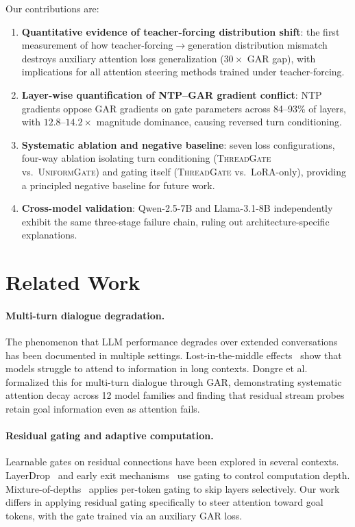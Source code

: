 \documentclass[11pt,a4paper]{article}
\newcommand{\gar}{\textsc{GAR}}
\newcommand{\tg}{\textsc{ThreadGate}}
\newcommand{\ug}{\textsc{UniformGate}}
\begin{document}
Our contributions are:
\begin{enumerate}
    \item \textbf{Quantitative evidence of teacher-forcing distribution shift}: the first measurement of how teacher-forcing$\to$generation distribution mismatch destroys auxiliary attention loss generalization ($30\times$ \gar{} gap), with implications for all attention steering methods trained under teacher-forcing.
    \item \textbf{Layer-wise quantification of NTP--\gar{} gradient conflict}: NTP gradients oppose \gar{} gradients on gate parameters across 84--93\% of layers, with $12.8$--$14.2\times$ magnitude dominance, causing reversed turn conditioning.
    \item \textbf{Systematic ablation and negative baseline}: seven loss configurations, four-way ablation isolating turn conditioning (\tg{} vs.\ \ug{}) and gating itself (\tg{} vs.\ LoRA-only), providing a principled negative baseline for future work.
    \item \textbf{Cross-model validation}: Qwen-2.5-7B and Llama-3.1-8B independently exhibit the same three-stage failure chain, ruling out architecture-specific explanations.
\end{enumerate}

\section{Related Work}
\label{sec:related}

\paragraph{Multi-turn dialogue degradation.}
The phenomenon that LLM performance degrades over extended conversations has been documented in multiple settings.
Lost-in-the-middle effects~\cite{liu2024lost} show that models struggle to attend to information in long contexts.
Dongre et al.~\cite{dongre2026} formalized this for multi-turn dialogue through \gar{}, demonstrating systematic attention decay across 12 model families and finding that residual stream probes retain goal information even as attention fails.

\paragraph{Residual gating and adaptive computation.}
Learnable gates on residual connections have been explored in several contexts.
LayerDrop~\cite{fan2020layerdrop} and early exit mechanisms~\cite{schuster2022confident} use gating to control computation depth.
Mixture-of-depths~\cite{raposo2024mixture} applies per-token gating to skip layers selectively.
Our work differs in applying residual gating specifically to steer attention toward goal tokens, with the gate trained via an auxiliary \gar{} loss.
\end{document}
